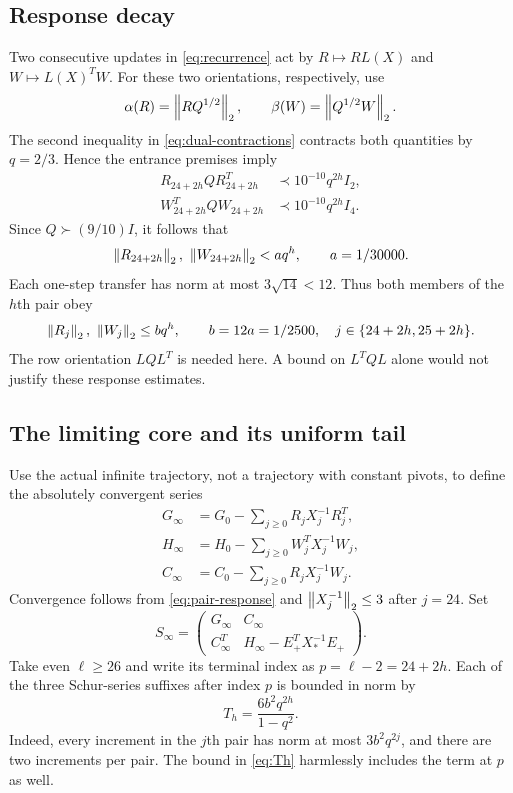 \subsection{Response decay}

Two consecutive updates in \eqref{eq:recurrence} act by
$R\mapsto RL(X)$ and $W\mapsto L(X)^TW$. For these two orientations,
respectively, use
\[
 \alpha(R)=\left\lVert RQ^{1/2}\right\rVert_2,
 \qquad \beta(W)=\left\lVert Q^{1/2}W\right\rVert_2.
\]
The second inequality in \eqref{eq:dual-contractions} contracts both
quantities by $q=2/3$. Hence the entrance premises imply
\begin{align*}
 R_{24+2h}QR_{24+2h}^T&\prec10^{-10}q^{2h}I_2,\\
 W_{24+2h}^TQW_{24+2h}&\prec10^{-10}q^{2h}I_4.
\end{align*}
Since $Q\succ(9/10)I$, it follows that
\begin{equation}
 \norm{R_{24+2h}}_2,\ \norm{W_{24+2h}}_2<a q^h,
 \qquad a=1/30000.
 \label{eq:even-response}
\end{equation}
Each one-step transfer has norm at most $3\sqrt{14}<12$. Thus both
members of the $h$th pair obey
\begin{equation}
 \left\lVert R_j\right\rVert_2,\ \left\lVert W_j\right\rVert_2\le bq^h,
 \qquad b=12a=1/2500,
 \quad j\in\{24+2h,25+2h\}.
 \label{eq:pair-response}
\end{equation}
The row orientation $LQL^T$ is needed here. A bound on $L^TQL$ alone
would not justify these response estimates.

\subsection{The limiting core and its uniform tail}

Use the actual infinite trajectory, not a trajectory with constant pivots,
to define the absolutely convergent series
\begin{align*}
 G_\infty&=G_0-\sum_{j\ge0}R_jX_j^{-1}R_j^T,\\
 H_\infty&=H_0-\sum_{j\ge0}W_j^TX_j^{-1}W_j,\\
 C_\infty&=C_0-\sum_{j\ge0}R_jX_j^{-1}W_j.
\end{align*}
Convergence follows from \eqref{eq:pair-response} and
$\left\lVert X_j^{-1}\right\rVert_2\le3$ after $j=24$. Set
\[
 S_\infty=\begin{pmatrix}
 G_\infty&C_\infty\\
 C_\infty^T&H_\infty-E_+^TX_*^{-1}E_+
 \end{pmatrix}.
\]
Take even $\ell\ge26$ and write its terminal index as
$p=\ell-2=24+2h$. Each of the three Schur-series suffixes after index
$p$ is bounded in norm by
\begin{equation}
 T_h=\frac{6b^2q^{2h}}{1-q^2}.
 \label{eq:Th}
\end{equation}
Indeed, every increment in the $j$th pair has norm at most
$3b^2q^{2j}$, and there are two increments per pair. The bound in
\eqref{eq:Th} harmlessly includes the term at $p$ as well.


